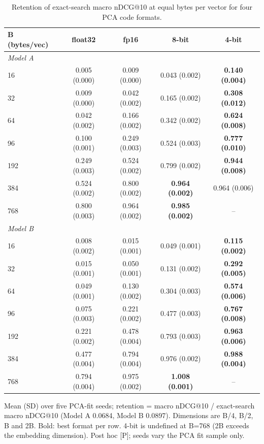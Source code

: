 \begin{table}[t]
\centering\small
\caption{Retention of exact-search macro nDCG@10 at equal bytes per vector for four PCA code formats.}
\label{tab:ladder}
\begin{tabular}{lcccc}
\toprule
B (bytes/vec) & float32 & fp16 & 8-bit & 4-bit \\
\midrule
\multicolumn{5}{l}{\textit{Model A}} \\
16 & 0.005 (0.000) & 0.009 (0.000) & 0.043 (0.002) & \textbf{0.140 (0.004)} \\
32 & 0.009 (0.000) & 0.042 (0.002) & 0.165 (0.002) & \textbf{0.308 (0.012)} \\
64 & 0.042 (0.002) & 0.166 (0.002) & 0.342 (0.002) & \textbf{0.624 (0.008)} \\
96 & 0.100 (0.001) & 0.249 (0.003) & 0.524 (0.003) & \textbf{0.777 (0.010)} \\
192 & 0.249 (0.003) & 0.524 (0.002) & 0.799 (0.002) & \textbf{0.944 (0.008)} \\
384 & 0.524 (0.002) & 0.800 (0.002) & \textbf{0.964 (0.002)} & 0.964 (0.006) \\
768 & 0.800 (0.003) & 0.964 (0.002) & \textbf{0.985 (0.002)} & -- \\
\midrule
\multicolumn{5}{l}{\textit{Model B}} \\
16 & 0.008 (0.002) & 0.015 (0.001) & 0.049 (0.001) & \textbf{0.115 (0.002)} \\
32 & 0.015 (0.001) & 0.050 (0.001) & 0.131 (0.002) & \textbf{0.292 (0.005)} \\
64 & 0.049 (0.001) & 0.130 (0.002) & 0.304 (0.003) & \textbf{0.574 (0.006)} \\
96 & 0.075 (0.003) & 0.221 (0.002) & 0.477 (0.003) & \textbf{0.767 (0.008)} \\
192 & 0.221 (0.002) & 0.478 (0.004) & 0.793 (0.003) & \textbf{0.963 (0.006)} \\
384 & 0.477 (0.004) & 0.794 (0.004) & 0.976 (0.002) & \textbf{0.988 (0.004)} \\
768 & 0.794 (0.004) & 0.975 (0.002) & \textbf{1.008 (0.001)} & -- \\
\bottomrule
\end{tabular}
\par\smallskip\footnotesize Mean (SD) over five PCA-fit seeds; retention = macro nDCG@10 / exact-search macro nDCG@10 (Model A 0.0684, Model B 0.0897). Dimensions are B/4, B/2, B and 2B. Bold: best format per row. 4-bit is undefined at B=768 (2B exceeds the embedding dimension). Post hoc [P]; seeds vary the PCA fit sample only.
\end{table}